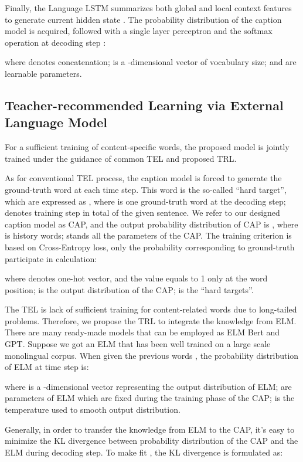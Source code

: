 \documentclass[10pt,twocolumn,letterpaper]{article}
\begin{document}
Finally, the Language LSTM summarizes both global and local context features to generate current hidden state . The probability distribution of the caption model  is acquired, followed with a single layer perceptron and the softmax operation at decoding step :


where  denotes concatenation;  is a -dimensional vector of vocabulary size;  and  are learnable parameters.



\subsection{Teacher-recommended Learning via External Language Model}

For a sufficient training of content-specific words, the proposed model is jointly trained under the guidance of common TEL and proposed TRL.

As for conventional TEL process, the caption model is forced to generate the ground-truth word at each time step. This word is the so-called ``hard target'', which are expressed as , where  is one ground-truth word at the  decoding step;  denotes training step in total of the given sentence. We refer to our designed caption model as CAP, and the output probability distribution of CAP is , where  is history words;  stands all the parameters of the CAP. The training criterion is based on Cross-Entropy loss, only the probability corresponding to ground-truth participate in calculation:

where  denotes one-hot vector, and the value equals to 1 only at the word  position;  is the output distribution of the CAP;  is the ``hard targets''. 

The TEL is lack of sufficient training for content-related words due to long-tailed problems. Therefore, we propose the TRL to integrate the knowledge from ELM. There are many ready-made models that can be employed as ELM \eg Bert and GPT. Suppose we got an ELM that has been well trained on a large scale monolingual corpus. When given the previous  words , the probability distribution of ELM at time step  is:

where  is a -dimensional vector representing the output distribution of ELM;  are parameters of ELM which are fixed during the training phase of the CAP;  is the temperature used to smooth output distribution. 

Generally, in order to transfer the knowledge from ELM to the CAP, it's easy to minimize the KL divergence between probability distribution of the CAP and the ELM during decoding step. To make  fit , the KL divergence is formulated as:
\end{document}
